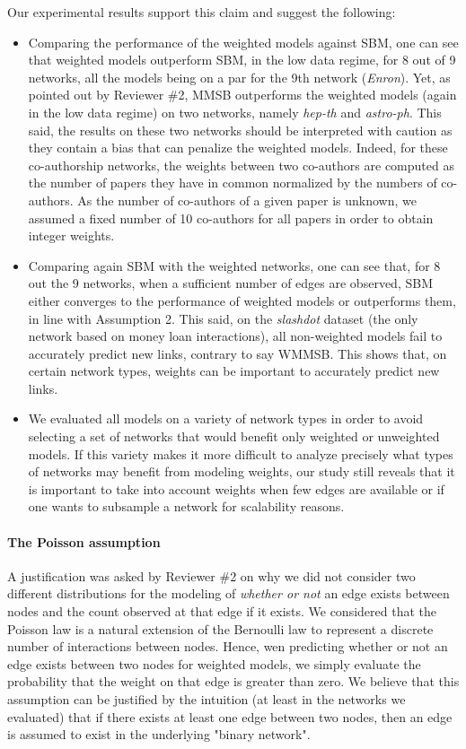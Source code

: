 \documentclass{article}
\begin{document}
%
Our experimental results support this claim and suggest the following:
%
\begin{itemize}
\item Comparing the performance of the weighted models against SBM, one can see that weighted models outperform SBM, in the low data regime, for 8 out of 9 networks, all the models being on a par for the 9th network (\textit{Enron}). Yet, as pointed out by Reviewer \#2, MMSB outperforms the weighted models (again in the low data regime) on two networks, namely \textit{hep-th} and \textit{astro-ph}. This said, the results on these two networks should be interpreted with caution as they contain a bias that can penalize the weighted models. Indeed, for these co-authorship networks, the weights between two co-authors are computed as the number of papers they have in common normalized by the numbers of co-authors. As the number of co-authors of a given paper is unknown, we assumed a fixed number of 10 co-authors for all papers in order to obtain integer weights.
\item Comparing again SBM with the weighted networks, one can see that, for 8 out the 9 networks, when a sufficient number of edges are observed, SBM either converges to the performance of weighted models or outperforms them, in line with Assumption 2. This said, on the \textit{slashdot} dataset (the only network based on money loan interactions), all non-weighted models fail to accurately predict new links, contrary to say WMMSB. This shows that, on certain network types, weights can be important to accurately predict new links.
\item We evaluated all models on a variety of network types in order to avoid selecting a set of networks that would benefit only weighted or unweighted models. If this variety makes it more difficult to analyze precisely what types of networks may benefit from modeling weights, our study still reveals that it is important to take into account weights when few edges are available or if one wants to subsample a network for scalability reasons.
\end{itemize}

\paragraph{The Poisson assumption} A justification was asked by Reviewer \#2 on why we did not consider two different distributions for the modeling of \emph{whether or not} an edge exists between nodes and the count observed at that edge if it exists. We considered that the Poisson law is a natural extension of the Bernoulli law to represent a discrete number of interactions between nodes. Hence, wen predicting whether or not an edge exists between two nodes for weighted models, we simply evaluate the probability that the weight on that edge is greater than zero. We believe that this assumption can be justified by the intuition (at least in the networks we evaluated) that if there exists at least one edge between two nodes, then an edge is assumed to exist in the underlying "binary network".
\end{document}
